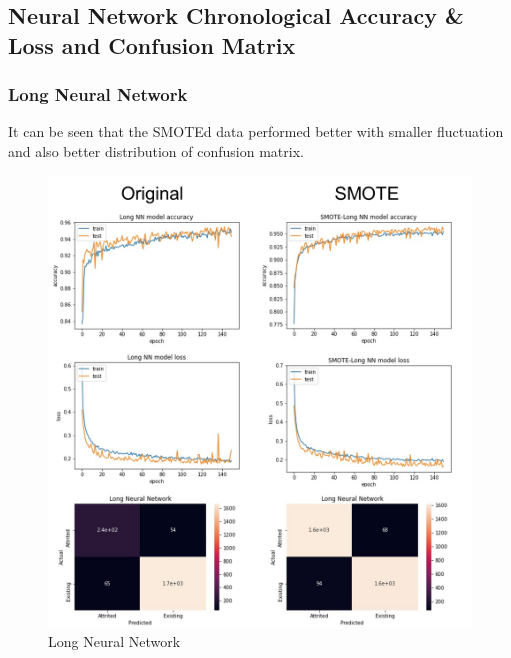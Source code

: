 \documentclass{homeworg}
\begin{document}
\subsection{Neural Network Chronological Accuracy \& Loss and Confusion Matrix}
\subsubsection{Long Neural Network}
It can be seen that the SMOTEd data performed better with smaller fluctuation and also better distribution of confusion matrix.
\begin{figure}[H]
    \centering
    \includegraphics[scale=0.6]{figure/LONG NN SUMMAR.png}
    \caption{Long Neural Network}
    \label{fig:LNNSummary}
\end{figure}
\end{document}
